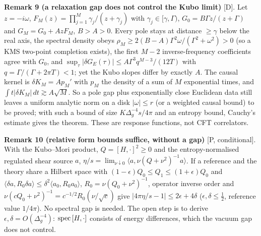 \textbf{Remark 9 (a relaxation gap does not control the Kubo limit)} [D]. Let $z=-i\omega$, $F_M(z)=\prod_{j=1}^M\gamma_j/(z+\gamma_j)$ with
$\gamma_j\in[\gamma,\Gamma)$, $G_0=B\Gamma z/(z+\Gamma)$ and $G_M=G_0+AzF_M$, $B>A>0$. Every pole stays at distance $\ge\gamma$ below the real axis, the
spectral density obeys $\rho_M\ge2(B-A)\Gamma^2\omega/(\Gamma^2+\omega^2)>0$ (so a KMS two-point completion exists), the first $M-2$ inverse-frequency
coefficients agree with $G_0$, and $\sup_\tau|\delta G_E(\tau)|\le A\Gamma^3q^{M-3}/(12T)$ with $q=\Gamma/(\Gamma+2\pi T)<1$; yet the Kubo slopes differ
by exactly $A$. The causal kernel is $\delta K_M=Ap_M'$ with $p_M$ the density of a sum of $M$ exponential times, and
$\int t|\delta K_M|\,dt\gtrsim A\sqrt M$. So a pole gap plus exponentially close Euclidean data still leaves a uniform analytic norm on a disk
$|\omega|\le r$ (or a weighted causal bound) to be proved; with such a bound of size $K\Delta_g^{-4}s/4\pi$ and an entropy bound, Cauchy's estimate
gives the theorem. These are response functions, not CFT correlators.

\textbf{Remark 10 (relative form bounds suffice, without a gap)} [P, conditional]. With the Kubo--Mori product, $Q=[H,\cdot]^2\ge0$ and the
entropy-normalised regulated shear source $a$, $\eta/s=\lim_{\nu\downarrow0}\langle a,\nu(Q+\nu^2)^{-1}a\rangle$. If a reference and the theory share a
Hilbert space with $(1-\epsilon)Q_0\le Q_1\le(1+\epsilon)Q_0$ and $\langle\delta a,R_0\delta a\rangle\le\delta^2\langle a_0,R_0a_0\rangle$, $R_0=\nu(Q_0+\nu^2)^{-1}$,
operator inverse order and $\nu(cQ_0+\nu^2)^{-1}=c^{-1/2}R_0(\nu/\sqrt c)$ give $|4\pi\eta/s-1|\le2\epsilon+4\delta$ ($\epsilon,\delta\le\tfrac12$, reference value
$1/4\pi$). No spectral gap is needed. The open step is to derive $\epsilon,\delta=O(\Delta_g^{-4})$: ${\rm spec}\,[H,\cdot]$ consists of energy
differences, which the vacuum gap does not control.

